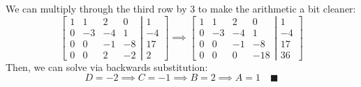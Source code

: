 \documentclass[letterpaper, 11pt]{article}
\begin{document}
\begin{enumerate}
\[\]
We can multiply through the third row by 3 to make the arithmetic a bit cleaner:
\[ \left[ \begin{array}{cccc} 1 & 1 & 2 & 0 \\ 0 & -3 & -4 & 1 \\ 0 & 0 & -1 & -8 \\ 0 & 0 & 2 & -2 \end{array} \right| \left. \begin{array}{c} 1 \\ -4 \\ 17 \\ 2 \end{array} \right] \implies 
\left[ \begin{array}{cccc} 1 & 1 & 2 & 0 \\ 0 & -3 & -4 & 1 \\ 0 & 0 & -1 & -8 \\ 0 & 0 & 0 & -18 \end{array} \right| \left. \begin{array}{c} 1 \\ -4 \\ 17 \\ 36 \end{array} \right] 
\]
Then, we can solve via backwards substitution:
\[ D = -2 \implies C = -1 \implies B = 2 \implies A = 1 \quad\blacksquare \]

\end{enumerate}
\end{document}
